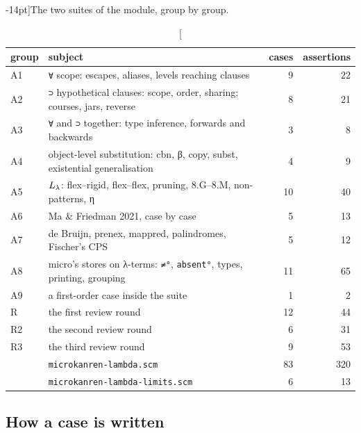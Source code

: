 \begin{table}[h]
\small
\caption[][-14pt]{The two suites of the module, group by group.}\label{tab:roadmap-suites}
\begin{tabular}{@{}llrr@{}}
\toprule
group & subject & cases & assertions \\
\midrule
A1 & \texttt{∀} scope: escapes, aliases, levels reaching clauses & 9 & 22 \\
A2 & \texttt{⊃} hypothetical clauses: scope, order, sharing; courses, jars, reverse & 8 & 21 \\
A3 & \texttt{∀} and \texttt{⊃} together: type inference, forwards and backwards & 3 & 8 \\
A4 & object-level substitution: cbn, β, copy, subst, existential generalisation & 4 & 9 \\
A5 & $L_\lambda$: flex--rigid, flex--flex, pruning, 8.G--8.M, non-patterns, η & 10 & 40 \\
A6 & Ma \& Friedman 2021, case by case & 5 & 13 \\
A7 & de Bruijn, prenex, mappred, palindromes, Fischer's CPS & 5 & 12 \\
A8 & micro's stores on λ-terms: \texttt{≠°}, \texttt{absent°}, types, printing, grouping & 11 & 65 \\
A9 & a first-order case inside the suite & 1 & 2 \\
R  & the first review round & 12 & 44 \\
R2 & the second review round & 6 & 31 \\
R3 & the third review round & 9 & 53 \\
\midrule
   & \texttt{microkanren-lambda.scm} & 83 & 320 \\
   & \texttt{microkanren-lambda-limits.scm} & 6 & 13 \\
\bottomrule
\end{tabular}\par\vspace{30pt}
\end{table}

\subsection{How a case is written}\label{sec:roadmap-case}

